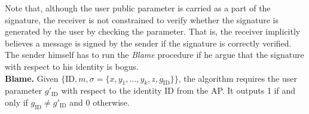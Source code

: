 \documentclass[times]{secauth}
\theoremstyle{definition}
\theoremstyle{remark}
\begin{document}
Note that, although the user public parameter is carried as a part of the signature, the receiver is not constrained to verify whether the signature is generated by the user by checking the parameter. 
That is, the receiver implicitly believes a message is signed by the sender if the signature is correctly verified. 
The sender himself has to run the \emph{Blame} procedure if he argue that the signature  with respect to his identity is bogus. 
\vspace{0.2cm}
\\
\textbf{Blame.} 
Given $\{\mathrm{ID}, m, \sigma = \{x, y_1, \ldots, y_k, z, g_{\mathrm{ID}}\}\}$, the algorithm requires the user parameter $g'_{\mathrm{ID}}$ with respect to the identity ID from the AP. 
It outputs 1 if and only if $g_{\mathrm{ID}} \neq g'_{\mathrm{ID}}$ and 0 otherwise.
\end{document}
